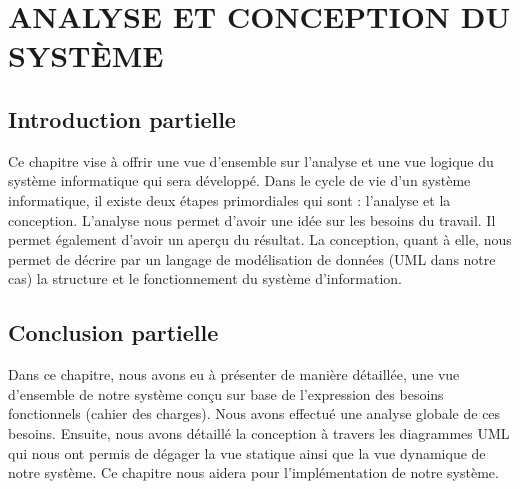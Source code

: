 \chapter[ANALYSE ET CONCEPTION DU SYSTÈME]{ANALYSE ET CONCEPTION DU SYSTÈME}
    \section[Introduction partielle]{Introduction partielle}
    Ce chapitre vise à offrir une vue d’ensemble sur l’analyse et une vue logique du
    système informatique qui sera développé. Dans le cycle de vie d’un système informatique,
    il existe deux étapes primordiales qui sont : l’analyse et la conception. L’analyse nous
    permet d’avoir une idée sur les besoins du travail. Il permet également d’avoir un aperçu
    du résultat. La conception, quant à elle, nous permet de décrire par un langage de
    modélisation de données (UML dans notre cas) la structure et le fonctionnement du
    système d’information.
        
        
        
        
        
    \section[Conclusion partielle]{Conclusion partielle}
    Dans ce chapitre, nous avons eu à présenter de manière détaillée, une vue
    d’ensemble de notre système conçu sur base de l’expression des besoins fonctionnels
    (cahier des charges). Nous avons effectué une analyse globale de ces besoins. Ensuite,
    nous avons détaillé la conception à travers les diagrammes UML qui nous ont permis de
    dégager la vue statique ainsi que la vue dynamique de notre système. Ce chapitre nous
    aidera pour l’implémentation de notre système.